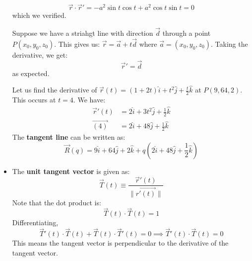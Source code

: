 \begin{itemize}
\begin{example}
\begin{equation}
            \vec{r} \cdot \vec{r}' = -a^2 \sin t \cos t + a^2\cos t\sin t = 0
        \end{equation}
        which we verified.
    \end{example}
    \begin{example}
        Suppose we have a striahgt line with direction $\vec{d}$ through a point $P(x_0, y_0, z_0)$. This gives us: $\vec{r}=\vec{a} + t\vec{d}$ where $\vec{a} = (x_0,y_0,z_0)$. Taking the derivative, we get:
        \begin{equation}
            \vec{r}' = \vec{d}
        \end{equation}
        as expected.
    \end{example}
    \begin{example}
        Let us find the derivative of $\vec{r}(t) = (1+2t)\hat{i} + t^2\hat{j} + \frac{t}{2}\hat{k}$ at $P(9, 64, 2)$. This occurs at $t=4$. We have:
        \begin{align}
            \vec{r}'(t) &= 2\hat{i}+3t^2\hat{j} + \frac{1}{2}\hat{k} \\
            \vec{(4)} &= 2\hat{i} + 48\hat{j} + \frac{1}{2}\hat{k}
        \end{align}
        The \textbf{tangent line} can be written as:
        \begin{equation}
            \vec{R}(q) = 9\hat{i}+64\hat{j}+2\hat{k} + q(2\hat{i}+48\hat{j}+\frac{1}{2}\hat{k})
        \end{equation}
    \end{example}
    \item The \textbf{unit tangent vector} is given as:
    \begin{equation}
        \vec{T}(t) \equiv \frac{\vec{r}'(t)}{\lVert \vec{r'(t)} \rVert}
    \end{equation}
    Note that the dot product is:
    \begin{equation}
        \vec{T}(t) \cdot \vec{T}(t) = 1
    \end{equation}
    Differentiating,
    \begin{equation}
        \vec{T}'(t) \cdot \vec{T}(t) + \vec{T}(t) \cdot \vec{T}'(t) = 0 \implies \vec{T}'(t) \cdot \vec{T}(t) = 0
    \end{equation}
    This means the tangent vector is perpendicular to the derivative of the tangent vector.
\end{itemize}
